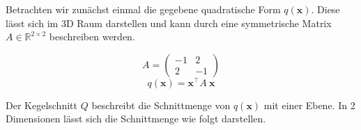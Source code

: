 Betrachten wir zunächst einmal die gegebene quadratische Form \( q(\mathbf{x}) \). Diese lässt sich im 3D Raum darstellen und kann durch eine symmetrische Matrix \( A \in \mathbb{R}^{2 \times 2} \) beschreiben werden. 

\begin{figure}[h]
    \centering
    \begin{minipage}{0.32\textwidth}
        \centering
        \begin{equation*}
            A = \begin{pmatrix} -1 & 2 \\ 2 & -1 \end{pmatrix}
        \end{equation*}
        \begin{equation*}
            q(\mathbf{x}) = \mathbf{x}^\top A \  \mathbf{x} 
        \end{equation*}
    \end{minipage}
    \begin{minipage}{0.45\textwidth}
    \end{minipage}
\end{figure}

Der Kegelschnitt \( Q \) beschreibt die Schnittmenge von \( q(\mathbf{x}) \) mit einer Ebene. In 2 Dimensionen lässt sich die Schnittmenge wie folgt darstellen. 


